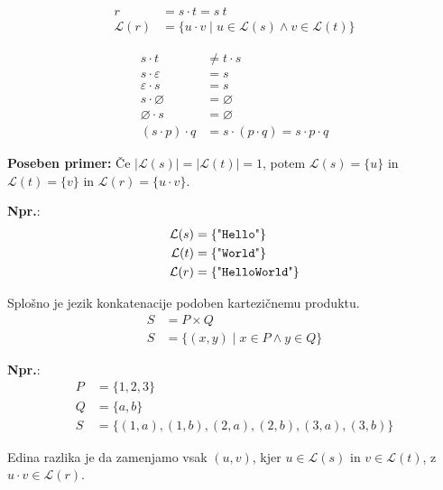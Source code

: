 \documentclass{article}
\newcommand{\Ex}{\textbf{Npr.}:\ }
\newcommand{\Special}[1]{\textbf{#1}}
\newcommand{\Empty}{\varnothing}
\newcommand{\Null}{\varepsilon}
\newcommand{\Language}[1]{\mathcal{L}(#1)}
\newcommand{\Str}[1]{\text{\textquotedbl\texttt{#1}\textquotedbl}}
\newcommand{\Seq}{\cdot}
\newcommand{\Spc}{\ }
\begin{document}
\begin{tcolorbox}[title={Definicija}]
\begin{equation*}
  \begin{aligned}
  r &= s \Seq t = s \Spc t\\
  \Language{r} &= \{ u \Seq v \mid u \in \Language{s} \land v \in \Language{t}\}
  \end{aligned}
\end{equation*}
\end{tcolorbox}

\begin{tcolorbox}[title={Pravila}]
\begin{equation*}
  \begin{aligned}
  s \Seq t &\not= t \Seq s\\
  s \Seq \Null &= s \\
  \Null \Seq s &= s   \\
  s \Seq \Empty &= \Empty \\
  \Empty \Seq s &= \Empty \\
  (s \Seq p) \Seq q &= s \Seq (p \Seq q) = s \Seq p \Seq q
  \end{aligned}
\end{equation*}
\end{tcolorbox}

\vspace{1em}
\Special{Poseben primer:} Če $|\Language{s}| = |\Language{t}| = 1$, potem $\Language{s} = \{u\}$ in $\Language{t} = \{v\}$ in $\Language{r} = \{u \Seq v\}$.

\Ex
\begin{align*}
  \Language{s} &= \{\Str{Hello}\}\\
  \Language{t} &= \{\Str{World}\}\\
  \Language{r} &= \{\Str{HelloWorld}\}
\end{align*}

Splošno je jezik konkatenacije podoben kartezičnemu produktu.
\begin{align*}
  S &= P \times Q \\
  S &= \{ (x, y) \mid x \in P \land y \in Q\}
\end{align*}

\Ex
\begin{align*}
  P &= \{1, 2, 3\}\\
  Q &= \{a, b\}\\
  S &= \{(1, a), (1, b), (2, a), (2, b), (3, a), (3, b) \}
\end{align*}

Edina razlika je da zamenjamo vsak $(u, v)$, kjer $u \in \Language{s}$ in $v\in \Language{t}$, z $u \Seq v \in \Language{r}$.
\end{document}
